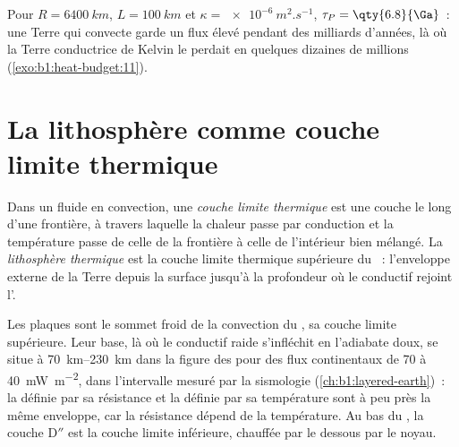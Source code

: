 Pour $R = \qty{6400}{km}$, $L = \qty{100}{km}$ et $\kappa =
\qty{e-6}{m^2.s^{-1}}$, $\tau_P = \qty{6.8}{\Ga}$~: une Terre qui convecte garde un
flux élevé pendant des milliards d'années, là où la Terre conductrice de Kelvin le
perdait en quelques dizaines de millions (\cref{exo:b1:heat-budget:11}).

\section{La lithosphère comme couche limite thermique}\label{sec:b1:heat-budget:boundary-layer}

\begin{definition}\label{def:b1:heat-budget:boundary-layer}
Dans un fluide en convection, une \emph{couche limite thermique} est une
couche le long d'une frontière, à travers laquelle la chaleur passe par conduction
et la température passe de celle de la frontière à celle de l'intérieur bien
mélangé. La \emph{lithosphère thermique} est la couche limite
thermique supérieure du ~: l'enveloppe externe de la Terre depuis la
surface jusqu'à la profondeur où le  conductif rejoint l'.
\end{definition}

Les plaques sont le sommet froid de la convection du , sa couche limite
supérieure. Leur base, là où le  conductif raide s'infléchit en l'adiabate
doux, se situe à \qtyrange{70}{230}{km} dans la figure des  pour des flux
continentaux de 70 à \qty{40}{mW.m^{-2}}, dans l'intervalle mesuré par la
sismologie (\cref{ch:b1:layered-earth})~: la  définie par sa
résistance et la  définie par sa température sont à peu près la même
enveloppe, car la résistance dépend de la température. Au bas du , la
couche D$''$ est la couche limite inférieure, chauffée par le dessous par le noyau.

